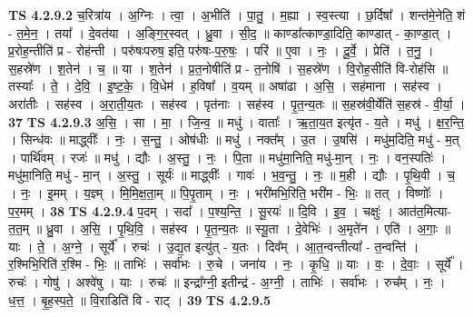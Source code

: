 \documentclass[17pt]{extarticle}
\begin{document}
                  \newline
                                \textbf{ TS 4.2.9.2} \newline
                  च॒रित्रा॑य । अ॒ग्निः । त्वा॒ । अ॒भीति॑ । पा॒तु॒ । म॒ह्या । स्व॒स्त्या । छ॒र्दिषा᳚ । शन्त॑मे॒नेति॒ शं - त॒मे॒न॒ । तया᳚ । दे॒वत॑या । अ॒ङ्गि॒र॒स्वत् । ध्रु॒वा । सी॒द॒ ॥ काण्डा᳚त्काण्डा॒दिति॒ काण्डात् - का॒ण्डा॒त् । प्र॒रोह॒न्तीति॑ प्र - रोह॑न्ती । परु॑षःपरुष॒ इति॒ परु॑षः-प॒रु॒षः॒ । परि॑ ॥ ए॒वा । नः॒ । दू॒र्वे॒ । प्रेति॑ । त॒नु॒ । स॒हस्रे॑ण । श॒तेन॑ । च॒ ॥ या । श॒तेन॑ । प्र॒त॒नोषीति॑ प्र - त॒नोषि॑ । स॒हस्रे॑ण । वि॒रोह॒सीति॑ वि-रोह॑सि ॥ तस्याः᳚ । ते॒ । दे॒वि॒ । इ॒ष्ट॒के॒ । वि॒धेम॑ । ह॒विषा᳚ । व॒यम् ॥ अषा॑ढा । अ॒सि॒ । सह॑माना । सह॑स्व । अरा॑तीः । सह॑स्व । अ॒रा॒ती॒य॒तः । सह॑स्व । पृत॑नाः । सह॑स्व । पृ॒त॒न्य॒तः ॥ स॒हस्र॑वी॒र्येति॑ स॒हस्र॑ - वी॒र्या॒ । \textbf{  37} \newline
                  \newline
                                \textbf{ TS 4.2.9.3} \newline
                  अ॒सि॒ । सा । मा॒ । जि॒न्व॒ ॥ मधु॑ । वाताः᳚ । ऋ॒ता॒य॒त इत्यृ॑त - य॒ते । मधु॑ । क्ष॒र॒न्ति॒ । सिन्ध॑वः ॥ माद्ध्वीः᳚ । नः॒ । स॒न्तु॒ । ओष॑धीः ॥ मधु॑ । नक्त᳚म् । उ॒त । उ॒षसि॑ । मधु॑म॒दिति॒ मधु॑ - म॒त् । पार्थि॑वम् । रजः॑ ॥ मधु॑ । द्यौः । अ॒स्तु॒ । नः॒ । पि॒ता ॥ मधु॑मा॒निति॒ मधु॑-मा॒न् । नः॒ । वन॒स्पतिः॑ । मधु॑मा॒निति॒ मधु॑ - मा॒न् । अ॒स्तु॒ । सूर्यः॑ ॥ माद्ध्वीः᳚ । गावः॑ । भ॒व॒न्तु॒ । नः॒ ॥ म॒ही । द्यौः । पृ॒थि॒वी । च॒ । नः॒ । इ॒मम् । य॒ज्ञ्म् । मि॒मि॒क्ष॒ता॒म् ॥ पि॒पृ॒ताम् । नः॒ । भरी॑मभि॒रिति॒ भरी॑म - भिः॒ ॥ तत् । विष्णोः᳚ । प॒र॒मम् । \textbf{  38} \newline
                  \newline
                                \textbf{ TS 4.2.9.4} \newline
                  प॒दम् । सदा᳚ । प॒श्य॒न्ति॒ । सू॒रयः॑ ॥ दि॒वि । इ॒व॒ । चक्षुः॑ । आत॑त॒मित्या-त॒त॒म् ॥ ध्रु॒वा । अ॒सि॒ । पृ॒थि॒वि॒ । सह॑स्व । पृ॒त॒न्य॒तः ॥ स्यू॒ता । दे॒वेभिः॑ । अ॒मृते॑न । एति॑ । अ॒गाः॒ ॥ याः । ते॒ । अ॒ग्ने॒ । सूर्ये᳚ । रुचः॑ । उ॒द्य॒त इत्यु॑त् - य॒तः । दिव᳚म् । आ॒त॒न्वन्तीत्या᳚ - त॒न्वन्ति॑ । र॒श्मिभि॒रिति॑ र॒श्मि - भिः॒ ॥ ताभिः॑ । सर्वा॑भः । रु॒चे । जना॑य । नः॒ । कृ॒धि॒ ॥ याः । वः॒ । दे॒वाः॒ । सूर्ये᳚ । रुचः॑ । गोषु॑ । अश्वे॑षु । याः । रुचः॑ ॥ इन्द्रा᳚ग्नी॒ इतीन्द्र॑ - अ॒ग्नी॒ । ताभिः॑ । सर्वा॑भः । रुच᳚म् । नः॒ । ध॒त्त॒ । बृ॒ह॒स्प॒ते॒ ॥ वि॒राडिति॑ वि - राट् । \textbf{  39} \newline
                  \newline
                                \textbf{ TS 4.2.9.5} \newline
\end{document}
